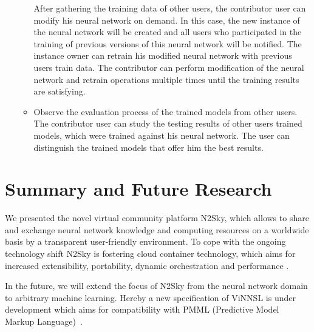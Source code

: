 \documentclass[conference]{IEEEtran}
\begin{document}
\begin{enumerate}
\begin{itemize}
After gathering the training data of other users, the contributor user can modify his neural network on demand. In this case, the new instance of the neural network will be created and all users who participated in the training of previous versions of this neural network will be notified. The instance owner can retrain his modified neural network with previous users train data. The contributor can perform modification of the neural network and retrain operations multiple times until the training results are satisfying.
\item Observe the evaluation process of the trained models from other users. The contributor user can study the testing results of other users trained models, which were trained against his neural network. The user can distinguish the trained models that offer him the best results. 
\end{itemize}

\end{enumerate}

\section{Summary and Future Research}
\label{sec:summary}

We presented the novel virtual community platform N2Sky, which allows to share and exchange neural network knowledge and computing resources on a worldwide basis by a transparent user-friendly environment. To cope with the ongoing technology shift N2Sky is fostering cloud container technology, which aims for increased extensibility, portability, dynamic orchestration and performance .

In the future, we will extend the focus of N2Sky from the neural network domain to arbitrary machine learning. Hereby a new specification of ViNNSL is under development which aims for compatibility with PMML (Predictive Model Markup Language)~\cite{pmml}. %

%



\end{document}
